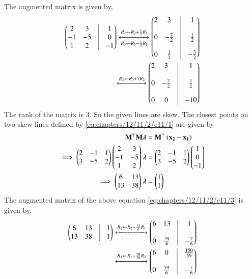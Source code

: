 \documentclass[journal,12pt,twocolumn]{IEEEtran}
\begin{document}
\begin{enumerate}
The augmented matrix is given by,
\begin{align}
\myvec{2&3&\vrule&1\\-1&-5&\vrule&0\\1&2&\vrule&-1}
\xleftrightarrow[R_3 \leftarrow R_3 - \frac{1}{2}R_1]{R_2 \leftarrow R_2 + \frac{1}{2}R_1}
\myvec{2&3&\vrule&1\\&&\vrule\\0&-\frac{7}{2}&\vrule&\frac{1}{2}\\&&\vrule\\0&\frac{1}{2}&\vrule&-\frac{3}{2}}\\
\xleftrightarrow{R_3 \leftarrow R_3 + 7R_2}
\myvec{2&3&\vrule&1\\&&\vrule\\0&-\frac{7}{2}&\vrule&\frac{1}{2}\\&&\vrule\\0&0&\vrule&-10}
\end{align}
The rank of the matrix is 3. So the given lines are skew.
The closest points on two skew lines defined by \eqref{eq:chapters/12/11/2/e11/1} are given by 
\begin{align}
\mathbf{M}^\top \mathbf{M}\bm{\lambda} &= \mathbf{M}^\top\left(\mathbf{x_2}-\mathbf{x_1}\right)\\
\implies \begin{pmatrix}2&-1&1\\3&-5&2\end{pmatrix} \begin{pmatrix}2&3\\-1&-5\\1&2\end{pmatrix}\bm{\lambda} &= \begin{pmatrix}2&-1&1\\3&-5&2\end{pmatrix} \begin{pmatrix}1\\0\\-1\end{pmatrix}\\
\implies \begin{pmatrix}6&13\\13&38\end{pmatrix}\bm{\lambda} &= \begin{pmatrix}1\\1\end{pmatrix}
\label{eq:chapters/12/11/2/e11/3}
\end{align}
The augmented matrix of the above equation \eqref{eq:chapters/12/11/2/e11/3} is given by,
\begin{align}
\myvec{6&13&\vrule&1\\13&38&\vrule&1}
\xleftrightarrow{R_2 \leftarrow R_2 - \frac{13}{6}R_1}
\myvec{6&13&\vrule&1 \\&&\vrule\\ 0&\frac{59}{6}&\vrule&-\frac{7}{6}}\\
\xleftrightarrow{R_1 \leftarrow R_1 - \frac{78}{59}R_2}
\myvec{6&0&\vrule&\frac{150}{59} \\&&\vrule\\ 0&\frac{59}{6}&\vrule&-\frac{7}{6}}

\end{align}
\end{enumerate}
\end{document}
